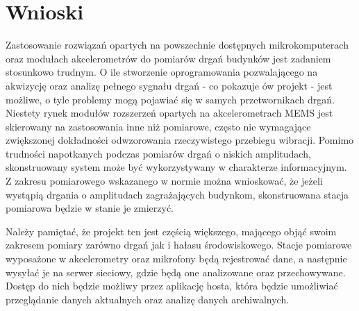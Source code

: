\documentclass[a4paper,12pt]{mwart}
\let\Oldsection\section
\renewcommand{\section}{\FloatBarrier\Oldsection}
\begin{document}
\section{Wnioski}

Zastosowanie rozwiązań opartych na powszechnie dostępnych mikrokomputerach oraz
modułach akcelerometrów do pomiarów drgań budynków jest zadaniem stosunkowo
trudnym. O ile stworzenie oprogramowania pozwalającego na akwizycję oraz analizę
pełnego sygnału drgań - co pokazuje ów projekt - jest możliwe, o tyle problemy
mogą pojawiać się w samych przetwornikach drgań. Niestety rynek modułów
rozszerzeń opartych na akcelerometrach MEMS jest skierowany na zastosowania inne
niż pomiarowe, często nie wymagające zwiększonej dokładności odwzorowania
rzeczywistego przebiegu wibracji. Pomimo trudności napotkanych podczas pomiarów
drgań o niskich amplitudach, skonstruowany system może być wykorzystywany w
charakterze informacyjnym. Z zakresu pomiarowego wskazanego w normie można
wnioskować, że jeżeli wystąpią drgania o amplitudach zagrażających budynkom,
skonstruowana stacja pomiarowa będzie w stanie je zmierzyć.

Należy pamiętać, że projekt ten jest częścią większego, mającego objąć swoim
zakresem pomiary zarówno drgań jak i hałasu środowiskowego. Stacje pomiarowe
wyposażone w akcelerometry oraz mikrofony będą rejestrować dane, a następnie
wysyłać je na serwer sieciowy, gdzie będą one analizowane oraz przechowywane.
Dostęp do nich będzie możliwy przez aplikację hosta, która będzie umożliwiać
przeglądanie danych aktualnych oraz analizę danych archiwalnych.

\printbibliography[title=Bibliografia]
\end{document}
